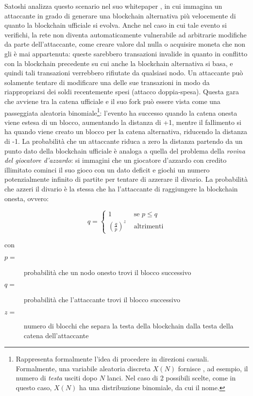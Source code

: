 Satoshi analizza questo scenario nel suo whitepaper \cite{bitcoin}, in cui immagina un attaccante in grado di generare una blockchain alternativa più velocemente di quanto la blockchain ufficiale si evolva.
Anche nel caso in cui tale evento si verifichi, la rete non diventa automaticamente vulnerabile ad arbitrarie modifiche da parte dell'attaccante, come creare valore dal nulla o acquisire moneta che non gli è mai appartenuta: queste sarebbero transazioni invalide in quanto in conflitto con la blockchain precedente su cui anche la blockchain alternativa si basa, e quindi tali transazioni verrebbero rifiutate da qualsiasi nodo. Un attaccante può solamente tentare di modificare una delle sue transazioni in modo da riappropriarsi dei soldi recentemente spesi (attacco doppia-spesa).
Questa gara che avviene tra la catena ufficiale e il suo fork può essere vista come una passeggiata aleatoria binomiale\footnote{Rappresenta formalmente l'idea di procedere in direzioni casuali. Formalmente, una variabile aleatoria discreta $X(N)$ fornisce , ad esempio, il numero di \emph{testa} usciti dopo $N$ lanci. Nel caso di 2 possibili scelte, come in questo caso, $X(N)$ ha una distribuzione binomiale, da cui il nome.}: l'evento ha successo quando la catena onesta viene estesa di un blocco, aumentando la distanza di +1, mentre il fallimento si ha quando viene creato un blocco per la catena alternativa, riducendo la distanza di -1.
La probabilità che un attaccante riduca a zero la distanza partendo da un punto dato della blockchain ufficiale è analoga a quella del problema della \emph{rovina del giocatore d'azzardo}: si immagini che un giocatore d'azzardo con credito illimitato cominci il suo gioco con un dato deficit e giochi un numero potenzialmente infinito di partite per tentare di azzerare il divario.
La probabilità che azzeri il divario è la stessa che ha l'attaccante di raggiungere la blockchain onesta, ovvero:

\[
q = \begin{cases}
1 & \text{ se } p \leq q \\
\left( \frac{q}{p} \right)^z & \text{ altrimenti}
\end{cases}
\]

con

\begin{description}
\item[$p = $] probabilità che un nodo onesto trovi il blocco successivo
\item[$q = $] probabilità che l'attaccante trovi il blocco successivo
\item[$z = $] numero di blocchi che separa la testa della blockchain dalla testa della catena dell'attaccante
\end{description}

